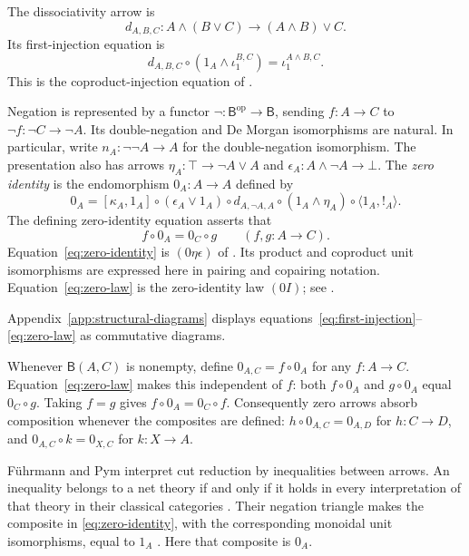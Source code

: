 \documentclass[11pt]{article}
\newcommand{\B}{\mathsf B}
\begin{document}
The dissociativity arrow is
\[
 d_{A,B,C}:A\wedge(B\vee C)\longrightarrow(A\wedge B)\vee C.
\]
Its first-injection equation is
\begin{equation}
 d_{A,B,C}\circ(1_A\wedge\iota_1^{B,C})
   =\iota_1^{A\wedge B,C}.
 \label{eq:first-injection}
\end{equation}
This is the coproduct-injection equation of
\cite[\S11.1, p.~234]{DP}.

Negation is represented by a functor
$\neg:\B^{\mathrm{op}}\to\B$, sending $f:A\to C$ to
$\neg f:\neg C\to\neg A$. Its double-negation and De Morgan
isomorphisms are natural. In particular, write
$n_A:\neg\neg A\to A$ for the double-negation isomorphism.
The presentation also has arrows
$\eta_A:\top\to\neg A\vee A$ and
$\epsilon_A:A\wedge\neg A\to\bot$.
The \emph{zero identity} is the endomorphism $0_A:A\to A$ defined by
\begin{equation}
 0_A=[\kappa_A,1_A]\circ(\epsilon_A\vee1_A)\circ d_{A,\neg A,A}
     \circ(1_A\wedge\eta_A)\circ\langle1_A,!_A\rangle.
 \label{eq:zero-identity}
\end{equation}
The defining zero-identity equation asserts that
\begin{equation}
 f\circ0_A=0_C\circ g
 \qquad(f,g:A\to C).
 \label{eq:zero-law}
\end{equation}
Equation~\eqref{eq:zero-identity} is $(0\eta\epsilon)$ of
\cite[\S14.2, p.~317]{DP}. Its product and coproduct unit isomorphisms
are expressed here in pairing and copairing notation.
Equation~\eqref{eq:zero-law} is the zero-identity law $(0I)$;
see \cite[\S14.3, p.~322]{DP}.

Appendix~\ref{app:structural-diagrams} displays
equations~\eqref{eq:first-injection}--\eqref{eq:zero-law}
as commutative diagrams.

Whenever $\B(A,C)$ is nonempty, define $0_{A,C}=f\circ0_A$ for any
$f:A\to C$. Equation~\eqref{eq:zero-law} makes this independent of
$f$: both $f\circ0_A$ and $g\circ0_A$ equal $0_C\circ g$.
Taking $f=g$ gives $f\circ0_A=0_C\circ f$. Consequently zero arrows
absorb composition whenever the composites are defined:
$h\circ0_{A,C}=0_{A,D}$ for $h:C\to D$, and
$0_{A,C}\circ k=0_{X,C}$ for $k:X\to A$.

F\"uhrmann and Pym interpret cut reduction by inequalities between
arrows. An inequality belongs to a net theory if and only if it
holds in every interpretation of that theory in their classical
categories \cite[Theorems~6.4--6.5]{FP}.
Their negation triangle makes the composite in
\eqref{eq:zero-identity}, with the corresponding monoidal unit
isomorphisms, equal to $1_A$ \cite[(11)]{FP}.
Here that composite is $0_A$.
\end{document}
